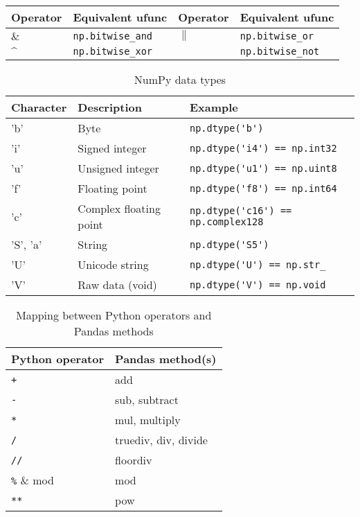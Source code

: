 \begin{table}[H]
    \centering
    \begin{tabular}{llll}
        \hline
        Operator & Equivalent ufunc      & Operator & Equivalent ufunc      \\
        \hline
        $\&$     & \verb|np.bitwise_and| & $\|$     & \verb|np.bitwise_or|  \\
        $\^$     & \verb|np.bitwise_xor| & $~$      & \verb|np.bitwise_not| \\
        \hline
    \end{tabular}
\end{table}

\begin{table}
    \centering
    \caption{NumPy data types}
    \label{NumPy data types}
    \begin{tabular}{lll}
        \hline
        Character & Description            & Example                                 \\
        \hline
        'b'       & Byte                   & \verb|np.dtype('b')|                    \\
        'i'       & Signed integer         & \verb|np.dtype('i4') == np.int32|       \\
        'u'       & Unsigned integer       & \verb|np.dtype('u1') == np.uint8|       \\
        'f'       & Floating point         & \verb|np.dtype('f8') == np.int64|       \\
        'c'       & Complex floating point & \verb|np.dtype('c16') == np.complex128| \\
        'S', 'a'  & String                 & \verb|np.dtype('S5')|                   \\
        'U'       & Unicode string         & \verb|np.dtype('U') == np.str_|         \\
        'V'       & Raw data (void)        & \verb|np.dtype('V') == np.void|         \\
        \hline
    \end{tabular}
\end{table}

\begin{table}
    \centering
    \caption{Mapping between Python operators and Pandas methods}
    \label{Mapping between Python operators and Pandas methods}
    \begin{tabular}{ll}
        \hline
        Python operator & Pandas method(s)     \\
        \hline
        \verb|+|        & add                  \\
        \verb|-|        & sub, subtract        \\
        \verb|*|        & mul, multiply        \\
        \verb|/|        & truediv, div, divide \\
        \verb|//|       & floordiv             \\
        \verb|%|        & mod                  \\
        \verb|**|       & pow                  \\
    \end{tabular}
\end{table}

